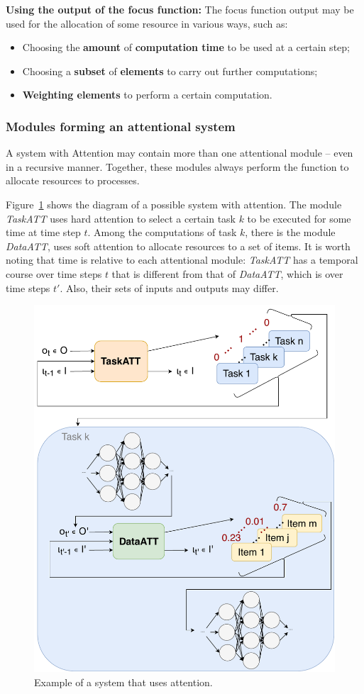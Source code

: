 \documentclass[12pt]{article}
\begin{document}
\textbf{Using the output of the focus function:}
The focus function output may be used for the allocation of some resource in various ways, such as:
\begin{itemize}
    \item Choosing the \textbf{amount} of \textbf{computation time} to be used at a certain step;
    \item Choosing a \textbf{subset} of \textbf{elements} to carry out further computations;
    \item \textbf{Weighting elements} to perform a certain computation.
\end{itemize}

\subsubsection{Modules forming an attentional system}
A system with Attention may contain more than one attentional module -- even in a recursive manner.
Together, these modules always perform the function to allocate resources to
processes.

Figure~\ref{fig:attsystem} shows the diagram of a possible system with attention.
The module \emph{TaskATT} uses hard attention to select a certain task $k$ to be executed for some time at time step $t$.
Among the computations of task $k$, there is the module \emph{DataATT}, uses soft attention to allocate resources to a set of items.
It is worth noting that time is relative to each attentional module: \emph{TaskATT} has a temporal course over time steps $t$ that is different from that of \emph{DataATT}, which is over time steps $t'$.
Also, their sets of inputs and outputs may differ.

\begin{figure}[H]
    \centering
    \includegraphics[width=0.7\linewidth]{./img/att_blocks_example.pdf}
    \caption{Example of a system that uses attention.}
\label{fig:attsystem}
\end{figure}
\end{document}

